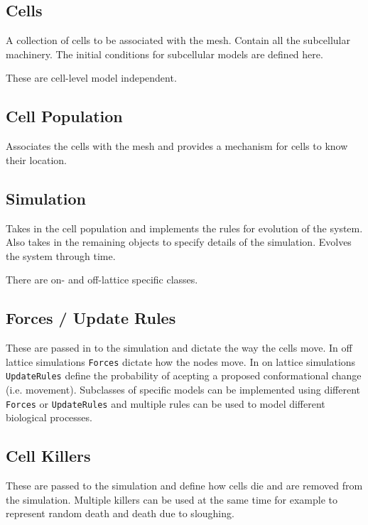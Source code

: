 \documentclass{siamltex}
\begin{document}
\subsection{Cells} \label{sec:structure:cells}
A collection of cells to be associated with the mesh. 
Contain all the subcellular machinery. 
The initial conditions for  subcellular models are defined here.

These are cell-level model independent.

\subsection{Cell Population} \label{sec:structure:cell_pop}
Associates the cells with the mesh and provides a mechanism for cells to know their location.

\subsection{Simulation} \label{sec:structure:simulation}
Takes in the cell population and implements the rules for evolution of the system.
Also takes in the remaining objects to specify details of the simulation.
Evolves the system through time.

There are on- and off-lattice specific classes.

\subsection{Forces / Update Rules} \label{sec:structure:updates}
These are passed in to the simulation and dictate the way the cells move.
In off lattice simulations \texttt{Forces} dictate how the nodes move.
In on lattice simulations \texttt{UpdateRules} define the probability of acepting a proposed conformational change (i.e. movement).
Subclasses of specific models can be implemented using different \texttt{Forces} or \texttt{UpdateRules} and multiple rules can be used to model different biological processes.


\subsection{Cell Killers} \label{sec:structure:cell_killers}
These are passed to the simulation and define how cells die and are removed from the simulation. 
Multiple killers can be used at the same time for example to represent random death and death due to sloughing.
\end{document}
